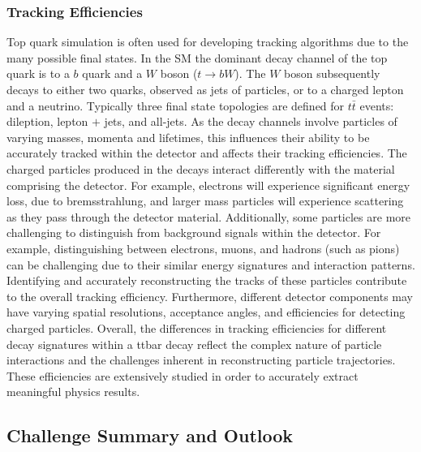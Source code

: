 \subsubsection{Tracking Efficiencies}
Top quark simulation is often used for developing tracking algorithms due to the many possible final states. In the SM the dominant decay channel of the top quark is to a $b$ quark and a $W$ boson ($t \to bW$). The $W$ boson subsequently decays to either two quarks, observed as jets of particles, or to a charged lepton and a neutrino. Typically three final state topologies are defined for $t\bar{t}$ events: dileption, lepton $+$ jets, and all-jets. As the decay channels involve particles of varying masses, momenta and lifetimes, this influences their ability to be accurately tracked within the detector and affects their tracking efficiencies. The charged particles produced in the decays interact differently with the material comprising the detector. For example, electrons will experience significant energy loss, due to bremsstrahlung, and larger mass particles will experience scattering as they pass through the detector material. Additionally, some particles are more challenging to distinguish from background signals within the detector. For example, distinguishing between electrons, muons, and hadrons (such as pions) can be challenging due to their similar energy signatures and interaction patterns. Identifying and accurately reconstructing the tracks of these particles contribute to the overall tracking efficiency. Furthermore, different detector components may have varying spatial resolutions, acceptance angles, and efficiencies for detecting charged particles. Overall, the differences in tracking efficiencies for different decay signatures within a ttbar decay reflect the complex nature of particle interactions and the challenges inherent in reconstructing particle trajectories. These efficiencies are extensively studied in order to accurately extract meaningful physics results.


\subsection{Challenge Summary and Outlook}
\label{trackml-key-findings}

